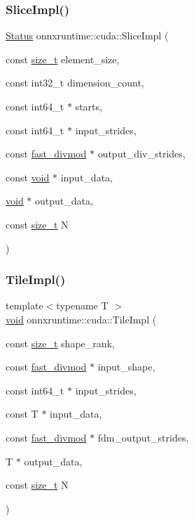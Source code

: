 \subsubsection{\texorpdfstring{Slice\+Impl()}{SliceImpl()}}
{\footnotesize\ttfamily \mbox{\hyperlink{classonnxruntime_1_1common_1_1Status}{Status}} onnxruntime\+::cuda\+::\+Slice\+Impl (\begin{DoxyParamCaption}\item[{const \mbox{\hyperlink{mlasi_8h_a503efbc1c6e50825320ad909366b78ab}{size\+\_\+t}}}]{element\+\_\+size,  }\item[{const int32\+\_\+t}]{dimension\+\_\+count,  }\item[{const int64\+\_\+t $\ast$}]{starts,  }\item[{const int64\+\_\+t $\ast$}]{input\+\_\+strides,  }\item[{const \mbox{\hyperlink{classonnxruntime_1_1cuda_1_1fast__divmod}{fast\+\_\+divmod}} $\ast$}]{output\+\_\+div\+\_\+strides,  }\item[{const \mbox{\hyperlink{mlasi_8h_a88f941d423cb2a819b70a1358982b1a6}{void}} $\ast$}]{input\+\_\+data,  }\item[{\mbox{\hyperlink{mlasi_8h_a88f941d423cb2a819b70a1358982b1a6}{void}} $\ast$}]{output\+\_\+data,  }\item[{const \mbox{\hyperlink{mlasi_8h_a503efbc1c6e50825320ad909366b78ab}{size\+\_\+t}}}]{N }\end{DoxyParamCaption})}

\mbox{\label{namespaceonnxruntime_1_1cuda_a87fd1918977bb7b705e1c56d6524e5b2}} 
\subsubsection{\texorpdfstring{Tile\+Impl()}{TileImpl()}}
{\footnotesize\ttfamily template$<$typename T $>$ \\
\mbox{\hyperlink{mlasi_8h_a88f941d423cb2a819b70a1358982b1a6}{void}} onnxruntime\+::cuda\+::\+Tile\+Impl (\begin{DoxyParamCaption}\item[{const \mbox{\hyperlink{mlasi_8h_a503efbc1c6e50825320ad909366b78ab}{size\+\_\+t}}}]{shape\+\_\+rank,  }\item[{const \mbox{\hyperlink{classonnxruntime_1_1cuda_1_1fast__divmod}{fast\+\_\+divmod}} $\ast$}]{input\+\_\+shape,  }\item[{const int64\+\_\+t $\ast$}]{input\+\_\+strides,  }\item[{const T $\ast$}]{input\+\_\+data,  }\item[{const \mbox{\hyperlink{classonnxruntime_1_1cuda_1_1fast__divmod}{fast\+\_\+divmod}} $\ast$}]{fdm\+\_\+output\+\_\+strides,  }\item[{T $\ast$}]{output\+\_\+data,  }\item[{const \mbox{\hyperlink{mlasi_8h_a503efbc1c6e50825320ad909366b78ab}{size\+\_\+t}}}]{N }\end{DoxyParamCaption})}

